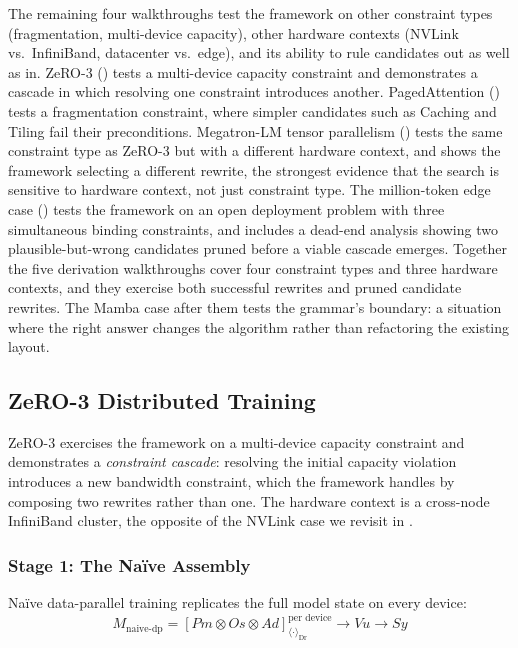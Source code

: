 \documentclass[10pt,twocolumn]{article}
\begin{document}
The remaining four walkthroughs test the framework on other constraint types (fragmentation, multi-device capacity), other hardware contexts (NVLink vs.\ InfiniBand, datacenter vs.\ edge), and its ability to rule candidates out as well as in. ZeRO-3 () tests a multi-device capacity constraint and demonstrates a cascade in which resolving one constraint introduces another. PagedAttention () tests a fragmentation constraint, where simpler candidates such as Caching and Tiling fail their preconditions. Megatron-LM tensor parallelism () tests the same constraint type as ZeRO-3 but with a different hardware context, and shows the framework selecting a different rewrite, the strongest evidence that the search is sensitive to hardware context, not just constraint type. The million-token edge case () tests the framework on an open deployment problem with three simultaneous binding constraints, and includes a dead-end analysis showing two plausible-but-wrong candidates pruned before a viable cascade emerges. Together the five derivation walkthroughs cover four constraint types and three hardware contexts, and they exercise both successful rewrites and pruned candidate rewrites. The Mamba case after them tests the grammar's boundary: a situation where the right answer changes the algorithm rather than refactoring the existing layout.

\subsection{ZeRO-3 Distributed Training}
\label{sec:zero-3}

ZeRO-3 \citep{rajbhandari2020} exercises the framework on a multi-device capacity constraint and demonstrates a \emph{constraint cascade}: resolving the initial capacity violation introduces a new bandwidth constraint, which the framework handles by composing two rewrites rather than one. The hardware context is a cross-node InfiniBand cluster, the opposite of the NVLink case we revisit in .

\subsubsection{Stage 1: The Na\"ive Assembly}

Na\"ive data-parallel training replicates the full model state on every device:
\begin{equation*}
M_{\text{naive-dp}} = [Pm \otimes Os \otimes Ad]_{\langle \cdot \rangle_{\text{Dr}}}^{\text{per device}} \rightarrow Vu \rightarrow Sy
\end{equation*}
\end{document}
